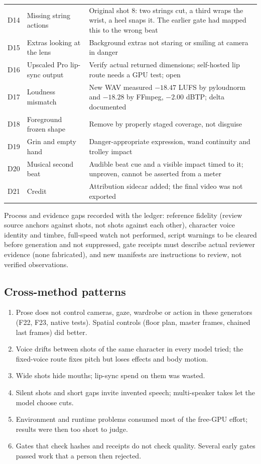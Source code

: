 \documentclass[11pt,a4paper]{article}
\begin{document}
\begin{longtable}{@{}P{1.6cm}P{5.6cm}P{8.3cm}@{}}
D14 & Missing string actions & Original shot 8: two strings cut, a third wraps the wrist, a heel snaps it. The earlier gate had mapped this to the wrong beat\\
D15 & Extras looking at the lens & Background extras not staring or smiling at camera in danger\\
D16 & Upscaled Pro lip-sync output & Verify actual returned dimensions; self-hosted lip route needs a GPU test; open\\
D17 & Loudness mismatch & New WAV measured $-18.47$ LUFS by pyloudnorm and $-18.28$ by FFmpeg, $-2.00$ dBTP; delta documented\\
D18 & Foreground frozen shape & Remove by properly staged coverage, not disguise\\
D19 & Grin and empty hand & Danger-appropriate expression, wand continuity and trolley impact\\
D20 & Musical second beat & Audible beat cue and a visible impact timed to it; unproven, cannot be asserted from a meter\\
D21 & Credit & Attribution sidecar added; the final video was not exported\\
\bottomrule
\end{longtable}
Process and evidence gaps recorded with the ledger: reference fidelity (review source anchors against shots, not shots against each other), character voice identity and timbre, full-speed watch not performed, script warnings to be cleared before generation and not suppressed, gate receipts must describe actual reviewer evidence (none fabricated), and new manifests are instructions to review, not verified observations.

\subsection{Cross-method patterns}
\begin{enumerate}
\item Prose does not control cameras, gaze, wardrobe or action in these generators (F22, F23, native tests). Spatial controls (floor plan, master frames, chained last frames) did better.
\item Voice drifts between shots of the same character in every model tried; the fixed-voice route fixes pitch but loses effects and body motion.
\item Wide shots hide mouths; lip-sync spend on them was wasted.
\item Silent shots and short gaps invite invented speech; multi-speaker takes let the model choose cuts.
\item Environment and runtime problems consumed most of the free-GPU effort; results were then too short to judge.
\item Gates that check hashes and receipts do not check quality. Several early gates passed work that a person then rejected.
\end{enumerate}
\end{document}
